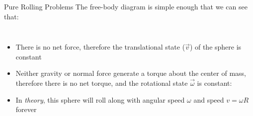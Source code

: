 \documentclass[12pt,compress,aspectratio=169]{beamer}
\begin{document}
\begin{frame}{Pure Rolling Problems}
  The free-body diagram is simple enough that we can see that:
  \begin{columns}
    \begin{itemize}
    \item There is no net force, therefore the translational state ($\vec v$)
      of the sphere is constant

      
    \item\vspace{-.25in} Neither gravity or normal force generate a torque
      about the center of mass, therefore there is no net torque, and the
      rotational state $\vec\omega$ is constant:

    \item\vspace{-.1in}In \emph{theory}, this sphere will roll along with
      angular speed $\omega$ and speed $v=\omega R$ forever
    \end{itemize}

  \end{columns}
\end{frame}
\end{document}
